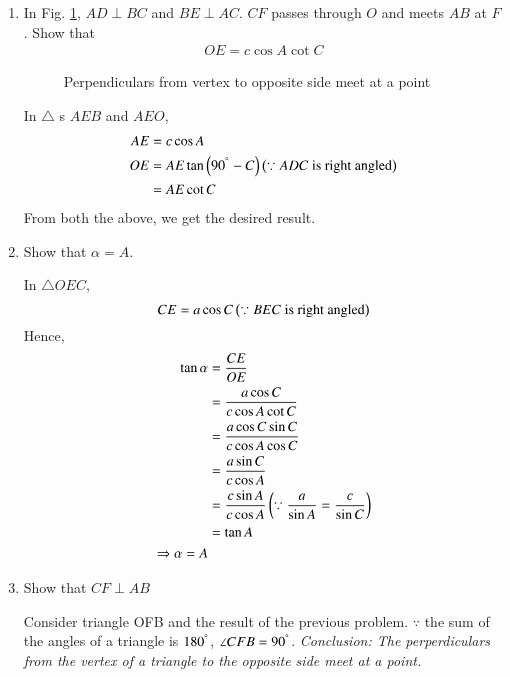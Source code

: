 \begin{enumerate}[label=\arabic*.,ref=\thesubsection.\theenumi]
\item
	In Fig. \ref{ch3_perp_triang}, $AD \perp BC$ and $BE \perp AC$. $CF$ passes through $O$ and meets
	$AB$ at $F$.  	
	Show that 
	\begin{align}
	OE = c \cos A \cot C
	\end{align}

	\begin{figure}[!ht]
		\begin{center}
			
			\resizebox{\columnwidth}{!}{}
		\end{center}
		\caption{Perpendiculars from vertex to opposite side meet at a point}
		\label{ch3_perp_triang}	
	\end{figure}
%
\solution In $\triangle$ s $AEB$ and $AEO$,
%
\begin{align}
AE &= c \cos A \\
OE &= AE \tan \left(90^{\degree} - C\right) \left(\because ADC \text{ is right angled}\right) \\
&= AE \cot C
\end{align}
%
From both the above, we get the desired result.
%
\item
	Show that $\alpha = A$.

\solution In $\triangle OEC$,
%
\begin{equation}
CE = a \cos C \left(\because BEC \text{ is right angled}\right)
\end{equation}
%
Hence,
%
\begin{equation}
\begin{split}
\tan \alpha &= \frac{CE}{OE} \\
&=  \frac{a \cos C}{c \cos A \cot C} \\
&=  \frac{a \cos C \sin C}{c \cos A \cos C} \\
&= \frac{a \sin C}{c \cos A } \\
&= \frac{c \sin A}{c \cos A } \left(\because \frac{a}{\sin A} = \frac{c}{\sin C}\right)\\
&= \tan A\\
\Rightarrow \alpha = A
\end{split}
\end{equation}
%
\item
	Show that $CF \perp AB$

\solution Consider triangle OFB and the result of the previous problem.  $\because$ the sum of the angles of a triangle is $180^{\degree}$, $\angle CFB = 90^{\degree}$.
{\em Conclusion: The perperdiculars from the vertex of a triangle to the opposite side meet at a point.}
\end{enumerate}
